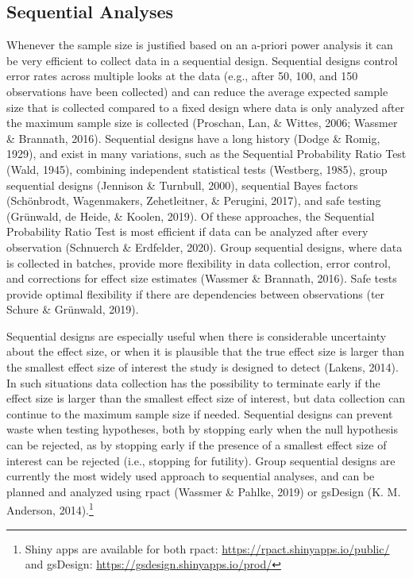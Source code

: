\documentclass[
  english,
  ,jou, a4paper,floatsintext]{apa6}
\begin{document}
\hypertarget{sequential-analyses}{%
\subsection{Sequential Analyses}\label{sequential-analyses}}

Whenever the sample size is justified based on an a-priori power analysis it can be very efficient to collect data in a sequential design. Sequential designs control error rates across multiple looks at the data (e.g., after 50, 100, and 150 observations have been collected) and can reduce the average expected sample size that is collected compared to a fixed design where data is only analyzed after the maximum sample size is collected (Proschan, Lan, \& Wittes, 2006; Wassmer \& Brannath, 2016). Sequential designs have a long history (Dodge \& Romig, 1929), and exist in many variations, such as the Sequential Probability Ratio Test (Wald, 1945), combining independent statistical tests (Westberg, 1985), group sequential designs (Jennison \& Turnbull, 2000), sequential Bayes factors (Schönbrodt, Wagenmakers, Zehetleitner, \& Perugini, 2017), and safe testing (Grünwald, de Heide, \& Koolen, 2019). Of these approaches, the Sequential Probability Ratio Test is most efficient if data can be analyzed after every observation (Schnuerch \& Erdfelder, 2020). Group sequential designs, where data is collected in batches, provide more flexibility in data collection, error control, and corrections for effect size estimates (Wassmer \& Brannath, 2016). Safe tests provide optimal flexibility if there are dependencies between observations (ter Schure \& Grünwald, 2019).

Sequential designs are especially useful when there is considerable uncertainty about the effect size, or when it is plausible that the true effect size is larger than the smallest effect size of interest the study is designed to detect (Lakens, 2014). In such situations data collection has the possibility to terminate early if the effect size is larger than the smallest effect size of interest, but data collection can continue to the maximum sample size if needed. Sequential designs can prevent waste when testing hypotheses, both by stopping early when the null hypothesis can be rejected, as by stopping early if the presence of a smallest effect size of interest can be rejected (i.e., stopping for futility). Group sequential designs are currently the most widely used approach to sequential analyses, and can be planned and analyzed using rpact (Wassmer \& Pahlke, 2019) or gsDesign (K. M. Anderson, 2014).\footnote{Shiny apps are available for both rpact: \url{https://rpact.shinyapps.io/public/} and gsDesign: \url{https://gsdesign.shinyapps.io/prod/}}
\end{document}

